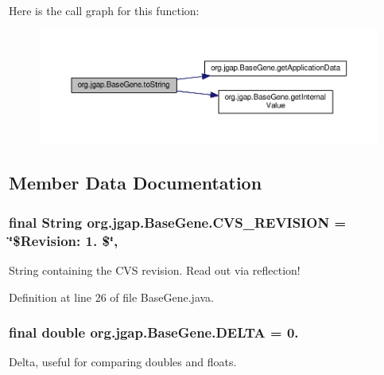 Here is the call graph for this function\-:
\nopagebreak
\begin{figure}[H]
\begin{center}
\leavevmode
\includegraphics[width=350pt]{classorg_1_1jgap_1_1_base_gene_a935dfec06cb77bff0d2a45859d6a35b7_cgraph}
\end{center}
\end{figure}




\subsection{Member Data Documentation}
\hypertarget{classorg_1_1jgap_1_1_base_gene_a7e83775c4b2b9391ec833869808d0154}{
\subsubsection[{C\-V\-S\-\_\-\-R\-E\-V\-I\-S\-I\-O\-N}]{\setlength{\rightskip}{0pt plus 5cm}final String org.\-jgap.\-Base\-Gene.\-C\-V\-S\-\_\-\-R\-E\-V\-I\-S\-I\-O\-N = \char`\"{}\$Revision\-: 1. \$\char`\"{}\hspace{0.3cm}{\ttfamily [static]}, {\ttfamily [private]}}}\label{classorg_1_1jgap_1_1_base_gene_a7e83775c4b2b9391ec833869808d0154}
String containing the C\-V\-S revision. Read out via reflection! 

Definition at line 26 of file Base\-Gene.\-java.

\hypertarget{classorg_1_1jgap_1_1_base_gene_a86edb3d2c29e5064305fabc2dd59a3b9}{
\subsubsection[{D\-E\-L\-T\-A}]{\setlength{\rightskip}{0pt plus 5cm}final double org.\-jgap.\-Base\-Gene.\-D\-E\-L\-T\-A = 0.\hspace{0.3cm}{\ttfamily [static]}}}\label{classorg_1_1jgap_1_1_base_gene_a86edb3d2c29e5064305fabc2dd59a3b9}
Delta, useful for comparing doubles and floats. 

